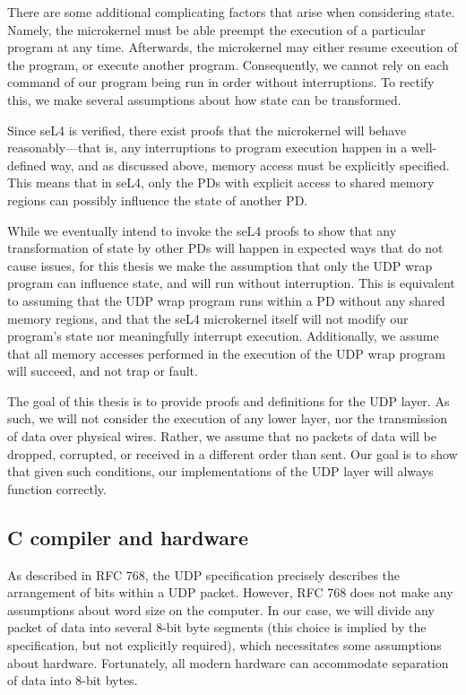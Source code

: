 \documentclass[twoside]{memoir}
\begin{document}
There are some additional complicating factors that arise when considering
state.
Namely, the microkernel must be able preempt the execution
of a particular program at any time.
Afterwards, the microkernel may either resume execution of the program,
or execute another program.
Consequently, we cannot rely on each command of our program
being run in order without interruptions.
To rectify this, we make several assumptions about how state can be transformed.

Since seL4 is verified, there exist proofs that the microkernel
will behave reasonably---that is, any interruptions to program execution
happen in a well-defined way, and as discussed above, memory access must
be explicitly specified.
This means that in seL4, only the PDs with explicit access to
shared memory regions can possibly influence the state of another PD.

While we eventually intend to invoke the seL4 proofs to show that any
transformation of state by other PDs will happen in expected ways
that do not cause issues,
for this thesis we make the assumption that
only the UDP wrap program can influence state, and will run without interruption.
This is equivalent to assuming that the UDP wrap program runs within
a PD without any shared memory regions, and that the seL4 microkernel itself
will not modify our program's state nor meaningfully interrupt execution.
Additionally, we assume that all memory accesses performed in the execution of
the UDP wrap program will succeed, and not trap or fault.

The goal of this thesis is to provide proofs and definitions for the UDP
layer.
As such, we will not consider the execution of any lower layer, nor
the transmission of data over physical wires.
Rather, we assume that no packets of data will be dropped, corrupted, or received in
a different order than sent.
Our goal is to show that given such conditions,
our implementations of the UDP layer will always function correctly.

\subsection{C compiler and hardware}
As described in RFC 768, the UDP specification precisely describes
the arrangement of bits within a UDP packet.
However, RFC 768 does not make any assumptions about word size on the computer.
In our case, we will divide any packet of data into several 8-bit byte segments
(this choice is implied by the specification, but not explicitly required),
which necessitates some assumptions about hardware.
Fortunately, all modern hardware can accommodate separation of data
into 8-bit bytes.
\end{document}
